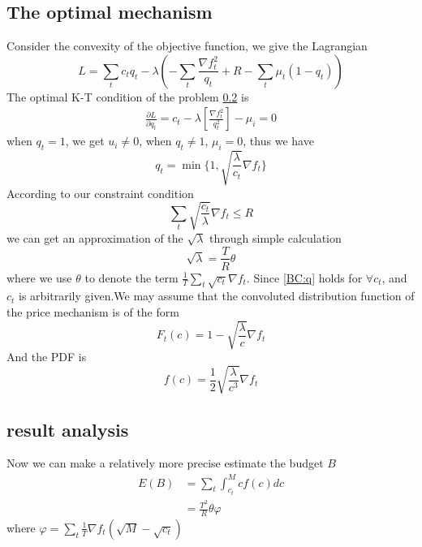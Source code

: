 \documentclass[10pt,conference,compsocconf,letterpaper]{IEEEtran}
\begin{document}
\subsection{The optimal mechanism}
Consider the convexity of the objective function, we give the Lagrangian
\begin{equation}
L=\sum_t c_t q_t -\lambda(-\sum_t\frac{\nabla f_t^2}{q_t}+R-\sum_t\mu_t(1-q_t))
\end{equation}
The optimal K-T condition of the problem \ref{} is 
\begin{align}
\frac{\partial L}{\partial q_t}=c_t-\lambda[\frac{\nabla f_t^2}{q_t^2}]-\mu_i=0
\end{align}
when $q_t=1$, we get $u_i\neq 0$, when $q_t\neq 1$, $\mu_i=0$, thus we have
\begin{equation}\label{BC:q}
q_t=\min\{1,\sqrt{\frac{\lambda}{c_t}}\nabla f_t\}
\end{equation}
According to our constraint condition
\begin{equation}
\sum_t \sqrt{\frac{c_t}{\lambda}}\nabla f_t\leq R
\end{equation}
we can get an approximation of the $\sqrt{\lambda}$ through simple calculation
\begin{equation}
\sqrt{\lambda}=\frac{T}{R}\theta
\end{equation}
where we use $\theta$ to denote the term $\frac{1}{T}\sum_t\sqrt{c_t}\nabla f_t$.
Since \ref{BC:q} holds for $\forall c_t$, and $c_t$ is arbitrarily given.We may assume that the convoluted distribution function of the price mechanism is of the form 
\begin{equation}
F_t(c)=1-\sqrt{\frac{\lambda}{c}}\nabla f_t
\end{equation}
And the PDF is 
\begin{equation}
f(c)=\frac{1}{2}\sqrt{\frac{{\lambda}}{c^3}}\nabla f_t
\end{equation}
\subsection{result analysis}
Now we can make a relatively more precise estimate the budget $B$
\begin{align}
E(B)&=\sum_t\int_{c_t}^Mcf(c)dc\\
&=\frac{T^2}{R}\theta\varphi
\end{align}
where $\varphi=\sum_t\frac{1}{T}\nabla f_t(\sqrt{M}-\sqrt{c_t})$
\end{document}
